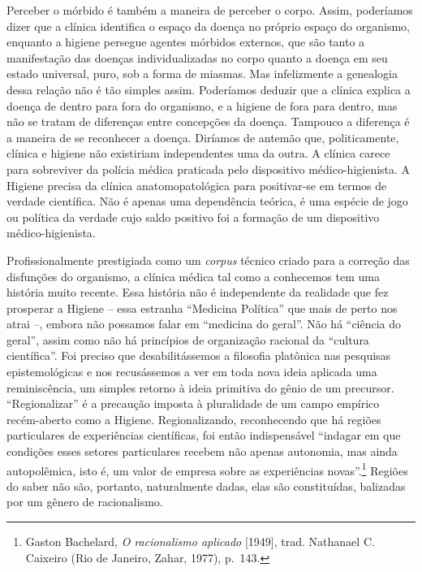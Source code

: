 Perceber o mórbido é também a maneira de perceber o corpo. Assim,
poderíamos dizer que a clínica identifica o espaço da doença no próprio
espaço do organismo, enquanto a higiene persegue agentes mórbidos
externos, que são tanto a manifestação das doenças individualizadas no
corpo quanto a doença em seu estado universal, puro, sob a forma de
miasmas. Mas infelizmente a genealogia dessa relação não é tão simples
assim. Poderíamos deduzir que a clínica explica a doença de dentro para
fora do organismo, e a higiene de fora para dentro, mas não se tratam de
diferenças entre concepções da doença. Tampouco a diferença é a maneira
de se reconhecer a doença. Diríamos de antemão que, politicamente,
clínica e higiene não existiriam independentes uma da outra. A clínica
carece para sobreviver da polícia médica praticada pelo dispositivo
médico-higienista. A Higiene precisa da clínica anatomopatológica para
positivar-se em termos de verdade científica. Não é apenas uma
dependência teórica, é uma espécie de jogo ou política da verdade cujo
saldo positivo foi a formação de um dispositivo médico-higienista.

Profissionalmente prestigiada como um \emph{corpus} técnico criado para
a correção das disfunções do organismo, a clínica médica tal como a
conhecemos tem uma história muito recente. Essa história não é
independente da realidade que fez prosperar a Higiene -- essa estranha
``Medicina Política'' que mais de perto nos atrai --, embora não
possamos falar em ``medicina do geral''. Não há ``ciência do geral'',
assim como não há princípios de organização racional da ``cultura
científica''. Foi preciso que desabilitássemos a filosofia platônica nas
pesquisas epistemológicas e nos recusássemos a ver em toda nova ideia
aplicada uma reminiscência, um simples retorno à ideia primitiva do
gênio de um precursor. ``Regionalizar'' é a precaução imposta à
pluralidade de um campo empírico recém-aberto como a Higiene.
Regionalizando, reconhecendo que há regiões particulares de experiências
científicas, foi então indispensável ``indagar em que condições esses
setores particulares recebem não apenas autonomia, mas ainda
autopolêmica, isto é, um valor de empresa sobre as experiências
novas''.\footnote{Gaston Bachelard, \emph{O racionalismo aplicado}
  {[}1949{]}, trad. Nathanael C. Caixeiro (Rio de Janeiro, Zahar, 1977),
  p.~143.} Regiões do saber não são, portanto, naturalmente dadas, elas
são constituídas, balizadas por um gênero de racionalismo.

